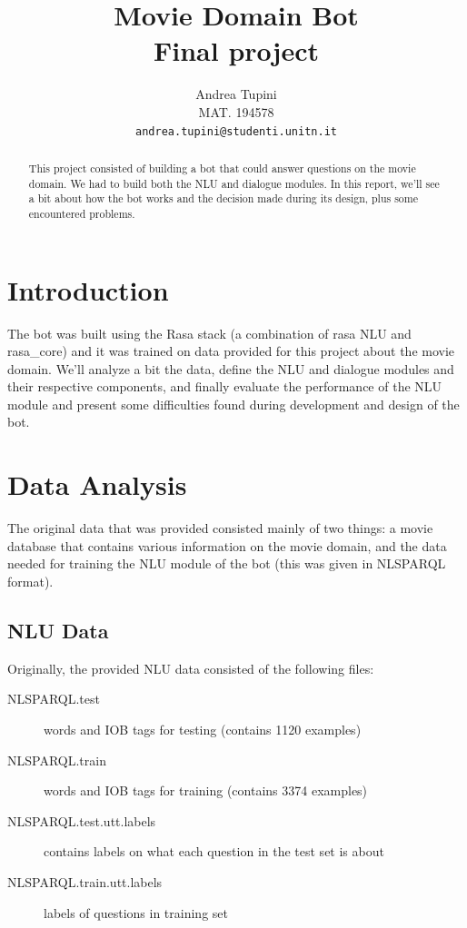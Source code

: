\documentclass[11pt,a4paper]{article}
\title{Movie Domain Bot \\ Final project}
\author{Andrea Tupini \\
  MAT.  194578 \\
  {\tt andrea.tupini@studenti.unitn.it}}
\date{}
\newcommand{\mntestsamples}{1120 }
\newcommand{\mntrainsamples}{3374 }
\begin{document}
	
\maketitle

\begin{abstract}
	
	This project consisted of building a bot that could answer questions on the movie domain. We had to build both the NLU and dialogue modules. In this report, we'll see a bit about how the bot works and the decision made during its design, plus some encountered problems.
	
\end{abstract} 

\section{Introduction}
	
	The bot was built using the Rasa stack (a combination of rasa NLU  and rasa\_core) and it was trained on data provided for this project about the movie domain. We'll analyze a bit the data, define the NLU and dialogue modules and their respective components, and finally evaluate the performance of the NLU module and present some difficulties found during development and design of the bot.

	
\section{Data Analysis}
\label{sec-data-analysis}
	
	The original data that was provided consisted mainly of two things: a movie database that contains various information on the movie domain, and the data needed for training the NLU module of the bot (this was given in NLSPARQL format).
	
	\subsection{NLU Data}
	\label{ssec-nlu-data}
	
		Originally, the provided NLU data consisted of the following files: 
		
		\begin{description}
			\item[NLSPARQL.test] words and IOB tags for testing (contains \mntestsamples examples)
			\item[NLSPARQL.train] words and IOB tags for training (contains \mntrainsamples examples)
			\item[NLSPARQL.test.utt.labels] contains labels on what each question in the test set is about              
			\item[NLSPARQL.train.utt.labels] labels of questions in training set
		\end{description}
	
\end{document}
